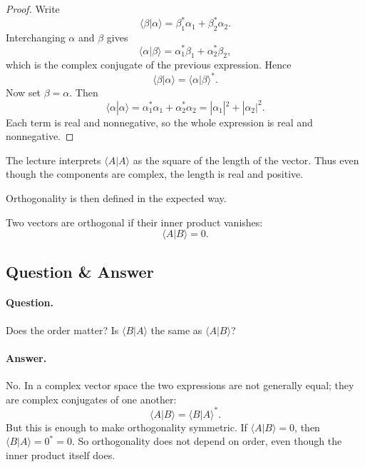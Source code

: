\begin{proof}
Write
\[
\langle\beta|\alpha\rangle=\beta_1^*\alpha_1+\beta_2^*\alpha_2.
\]
Interchanging \(\alpha\) and \(\beta\) gives
\[
\langle\alpha|\beta\rangle=\alpha_1^*\beta_1+\alpha_2^*\beta_2,
\]
which is the complex conjugate of the previous expression. Hence
\[
\langle\beta|\alpha\rangle=\langle\alpha|\beta\rangle^*.
\]
Now set \(\beta=\alpha\). Then
\[
\langle\alpha|\alpha\rangle
=
\alpha_1^*\alpha_1+\alpha_2^*\alpha_2
=
|\alpha_1|^2+|\alpha_2|^2.
\]
Each term is real and nonnegative, so the whole expression is real and nonnegative.
\end{proof}

The lecture interprets \(\langle A|A\rangle\) as the square of the length of the vector. Thus even though the components are complex, the length is real and positive.

Orthogonality is then defined in the expected way.

\begin{definition}
Two vectors are orthogonal if their inner product vanishes:
\begin{equation}
\langle A|B\rangle=0.
\end{equation}
\end{definition}

\subsection{Question \& Answer}

\paragraph{Question.} Does the order matter? Is \(\langle B|A\rangle\) the same as \(\langle A|B\rangle\)?

\paragraph{Answer.} No. In a complex vector space the two expressions are not generally equal; they are complex conjugates of one another:
\[
\langle A|B\rangle=\langle B|A\rangle^*.
\]
But this is enough to make orthogonality symmetric. If \(\langle A|B\rangle=0\), then \(\langle B|A\rangle=0^*=0\). So orthogonality does not depend on order, even though the inner product itself does.

